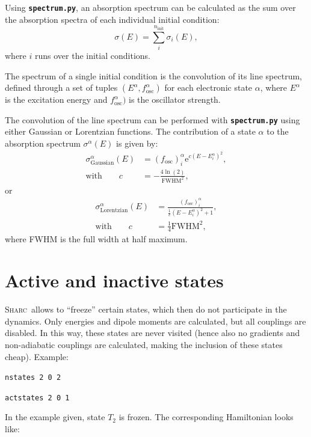 \documentclass[a4paper,11pt,DIV=15,openany,twoside=false]{scrbook}
\newcommand{\sharc}{\textsc{Sharc}}
\newcommand{\ttt}[1]{\textbf{\texttt{#1}}}
\newcommand{\E}{\ensuremath{\mathrm{e}}}
\newenvironment{example}{
  \vspace{0mm}
  \definecolor{shadecolor}{HTML}{E4F4FF}
  \begin{shaded}
}{
  \end{shaded}
}
\begin{document}
Using \ttt{spectrum.py}, an absorption spectrum can be calculated as the sum over the absorption spectra of each individual initial condition:
\begin{equation}
  \sigma(E)=\sum\limits_i^{n_\text{init}} \sigma_i(E),
\end{equation}
where $i$ runs over the initial conditions.

The spectrum of a single initial condition is the convolution of its line spectrum, defined through a set of tuples $(E^\alpha,f_\text{osc}^\alpha)$ for each electronic state $\alpha$, where $E^\alpha$ is the excitation energy and $f_\text{osc}^\alpha)$ is the oscillator strength.

The convolution of the line spectrum can be performed with \ttt{spectrum.py} using either Gaussian or Lorentzian functions. The contribution of a state $\alpha$ to the absorption spectrum $\sigma^\alpha(E)$ is given by:
\begin{align}
  \sigma_{\text{Gaussian}}^\alpha(E)&=
  \left(f_{\text{osc}}\right)_i^\alpha 
  \E^{c\left(E-E_i^\alpha\right)^2},\\
  \text{with}\qquad
  c&=-\frac{4\ln(2)}{\text{FWHM}^2},
\end{align}
or
\begin{align}
  \sigma_{\text{Lorentzian}}^\alpha(E)&=
  \frac{\left(f_{\text{osc}}\right)_i^\alpha}{\frac{1}{c}\left(E-E_i^\alpha\right)^2+1},\\
  \text{with}\qquad
  c&=\frac{1}{4}\text{FWHM}^2,
\end{align}
where FWHM is the full width at half maximum.


\section{Active and inactive states}\label{met:activestates}

\sharc\ allows to ``freeze'' certain states, which then do not participate in the dynamics. Only energies and dipole moments are calculated, but all couplings are disabled. In this way, these states are never visited (hence also no gradients and non-adiabatic couplings are calculated, making the inclusion of these states cheap). Example:

\newcommand{\R}{\cellcolor{RL!30}}
\begin{example}
  \verb|nstates 2 0 2|

  \verb|actstates 2 0 1|
\end{example}

In the example given, state $T_2$ is frozen. The corresponding Hamiltonian looks like:
\end{document}
